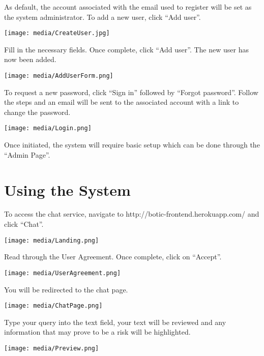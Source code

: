 \documentclass[11pt]{article}
\begin{document}
\begin{flushleft}
	As default, the account associated with the email used to register will be set as the system administrator. To add a new user, click “Add user”.
\end{flushleft}
\texttt{[image: media/CreateUser.jpg]}

\begin{flushleft}
	Fill in the necessary fields. Once complete, click “Add user”. The new user has now been added.
\end{flushleft}
\texttt{[image: media/AddUserForm.png]}

\begin{flushleft}
	To request a new password, click “Sign in” followed by “Forgot password”. Follow the steps and an email will be sent to the associated account with a link to change the password.
\end{flushleft}
\texttt{[image: media/Login.png]}

\begin{flushleft}
	Once initiated, the system will require basic setup which can be done through the “Admin Page”.
\end{flushleft}

\section{Using the System}
\begin{flushleft}
	To access the chat service, navigate to http://botic-frontend.herokuapp.com/ and click “Chat”.
\end{flushleft}
\texttt{[image: media/Landing.png]}

\begin{flushleft}
	Read through the User Agreement. Once complete, click on “Accept”.
\end{flushleft}
\texttt{[image: media/UserAgreement.png]}

\begin{flushleft}
	You will be redirected to the chat page.
\end{flushleft}
\texttt{[image: media/ChatPage.png]}

\begin{flushleft}
	Type your query into the text field, your text will be reviewed and any information that may prove to be a risk will be highlighted.
\end{flushleft}
\texttt{[image: media/Preview.png]}
\end{document}
